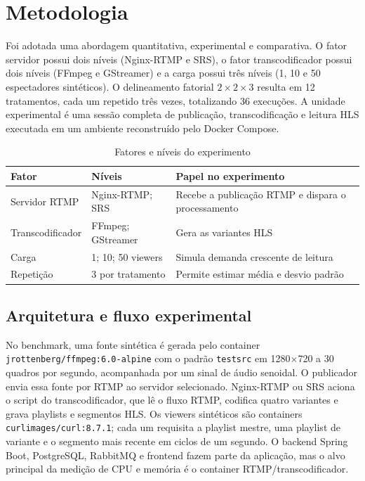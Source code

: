 \section{Metodologia}

Foi adotada uma abordagem quantitativa, experimental e comparativa. O fator servidor possui dois níveis (Nginx-RTMP e SRS), o fator transcodificador possui dois níveis (FFmpeg e GStreamer) e a carga possui três níveis (1, 10 e 50 espectadores sintéticos). O delineamento fatorial $2\times2\times3$ resulta em 12 tratamentos, cada um repetido três vezes, totalizando 36 execuções. A unidade experimental é uma sessão completa de publicação, transcodificação e leitura HLS executada em um ambiente reconstruído pelo Docker Compose.

\begin{table}[H]
\centering
\caption{Fatores e níveis do experimento}
\begin{tabularx}{\textwidth}{@{}lXX@{}}
\toprule
Fator & Níveis & Papel no experimento \\
\midrule
Servidor RTMP & Nginx-RTMP; SRS & Recebe a publicação RTMP e dispara o processamento \\
Transcodificador & FFmpeg; GStreamer & Gera as variantes HLS \\
Carga & 1; 10; 50 viewers & Simula demanda crescente de leitura \\
Repetição & 3 por tratamento & Permite estimar média e desvio padrão \\
\bottomrule
\end{tabularx}
\end{table}

\subsection{Arquitetura e fluxo experimental}

No benchmark, uma fonte sintética é gerada pelo container \texttt{jrottenberg/ffmpeg:6.0-alpine} com o padrão \texttt{testsrc} em 1280$\times$720 a 30 quadros por segundo, acompanhada por um sinal de áudio senoidal. O publicador envia essa fonte por RTMP ao servidor selecionado. Nginx-RTMP ou SRS aciona o script do transcodificador, que lê o fluxo RTMP, codifica quatro variantes e grava playlists e segmentos HLS. Os viewers sintéticos são containers \texttt{curlimages/curl:8.7.1}; cada um requisita a playlist mestre, uma playlist de variante e o segmento mais recente em ciclos de um segundo. O backend Spring Boot, PostgreSQL, RabbitMQ e frontend fazem parte da aplicação, mas o alvo principal da medição de CPU e memória é o container RTMP/transcodificador.


